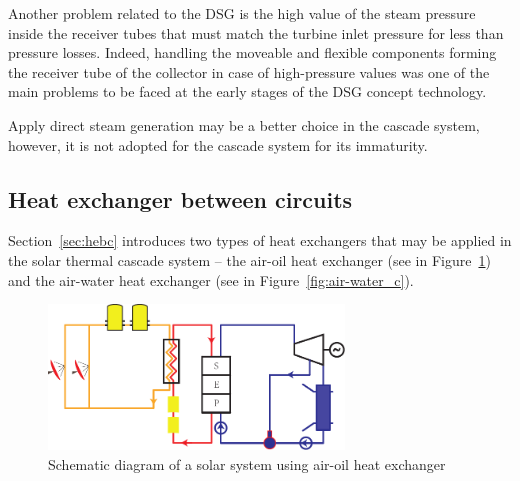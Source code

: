 Another problem related to the DSG is the high value of the steam pressure inside the receiver tubes that must match the turbine inlet pressure for less than pressure losses. Indeed, handling the moveable and flexible components forming the receiver tube of the collector in case of high-pressure values was one of the main problems to be faced at the early stages of the DSG concept technology. 

Apply direct steam generation may be a better choice in the cascade system, however, it is not adopted for the cascade system for its immaturity.

\subsection{Heat exchanger between circuits}

Section~\ref{sec:hebc} introduces two types of heat exchangers that may be applied in the solar thermal cascade system -- the air-oil heat exchanger (see in Figure~\ref{fig:air-oil_c}) and the air-water heat exchanger (see in Figure~\ref{fig:air-water_c}). 

\begin{figure}[h]
\centering 
\includegraphics[width=0.7\textwidth]{fig/air-oil}
\caption{Schematic diagram of a solar system using air-oil heat exchanger}\label{fig:air-oil_c}
\end{figure}

